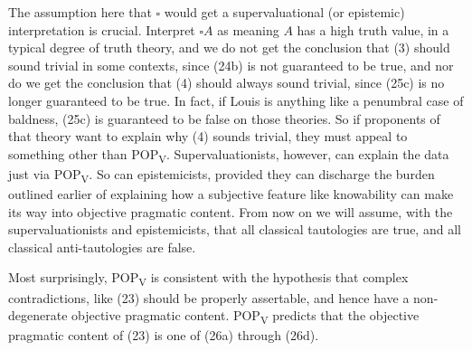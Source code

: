 The assumption here that \(\square\)  would get a supervaluational (or epistemic) interpretation is crucial. Interpret \(\square A\) as meaning \(A\) has a high truth value, in a typical degree of truth theory, and we do not get the conclusion that (3) should sound trivial in some contexts, since (24b) is not guaranteed to be true, and nor do we get the conclusion that (4) should always sound trivial, since (25c) is no longer guaranteed to be true. In fact, if Louis is anything like a penumbral case of baldness, (25c) is guaranteed to be false on those theories. So if proponents of that theory want to explain why (4) sounds trivial, they must appeal to something other than POP\textsubscript{V}. Supervaluationists, however, can explain the data just via POP\textsubscript{V}. So can epistemicists, provided they can discharge the burden outlined earlier of explaining how a subjective feature like knowability can make its way into objective pragmatic content. From now on we will assume, with the supervaluationists and epistemicists, that all classical tautologies are true, and all classical anti-tautologies are false.

Most surprisingly, POP\textsubscript{V} is consistent with the hypothesis that complex contradictions, like (23) should be properly assertable, and hence have a non-degenerate objective pragmatic content. POP\textsubscript{V} predicts that the objective pragmatic content of (23) is one of (26a) through (26d).


